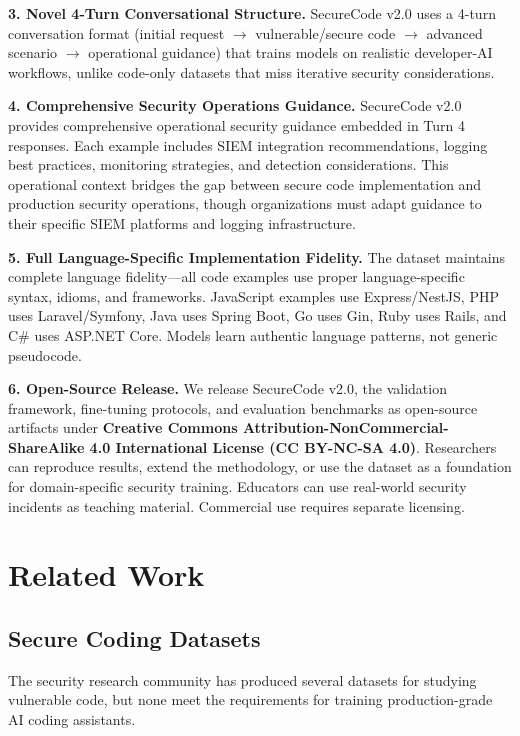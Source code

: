 \documentclass[11pt,letterpaper]{article}
\begin{document}
\textbf{3. Novel 4-Turn Conversational Structure.}
SecureCode v2.0 uses a 4-turn conversation format (initial request $\rightarrow$ vulnerable/secure code $\rightarrow$ advanced scenario $\rightarrow$ operational guidance) that trains models on realistic developer-AI workflows, unlike code-only datasets that miss iterative security considerations.

\textbf{4. Comprehensive Security Operations Guidance.}
SecureCode v2.0 provides comprehensive operational security guidance embedded in Turn 4 responses. Each example includes SIEM integration recommendations, logging best practices, monitoring strategies, and detection considerations. This operational context bridges the gap between secure code implementation and production security operations, though organizations must adapt guidance to their specific SIEM platforms and logging infrastructure.

\textbf{5. Full Language-Specific Implementation Fidelity.}
The dataset maintains complete language fidelity---all code examples use proper language-specific syntax, idioms, and frameworks. JavaScript examples use Express/NestJS, PHP uses Laravel/Symfony, Java uses Spring Boot, Go uses Gin, Ruby uses Rails, and C\# uses ASP.NET Core. Models learn authentic language patterns, not generic pseudocode.

\textbf{6. Open-Source Release.}
We release SecureCode v2.0, the validation framework, fine-tuning protocols, and evaluation benchmarks as open-source artifacts under \textbf{Creative Commons Attribution-NonCommercial-ShareAlike 4.0 International License (CC BY-NC-SA 4.0)}. Researchers can reproduce results, extend the methodology, or use the dataset as a foundation for domain-specific security training. Educators can use real-world security incidents as teaching material. Commercial use requires separate licensing.

\section{Related Work}

\subsection{Secure Coding Datasets}

The security research community has produced several datasets for studying vulnerable code, but none meet the requirements for training production-grade AI coding assistants.
\end{document}

